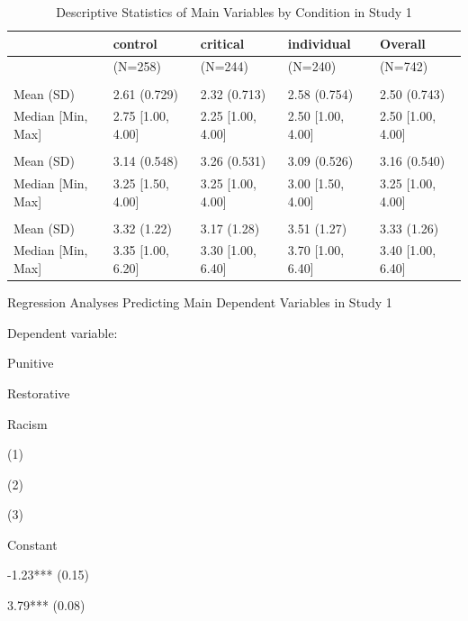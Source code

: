 \documentclass[
]{book}
\begin{document}
\begin{table}

\caption{\label{tab:maindvs-table-s1}Descriptive Statistics of Main Variables by Condition in Study 1}
\centering
\begin{tabular}[t]{lllll}
\toprule
  & control & critical & individual & Overall\\
\midrule
 & (N=258) & (N=244) & (N=240) & (N=742)\\
\addlinespace[0.3em]
\multicolumn{5}{l}{\textbf{Punitive Policy Support}}\\
\hspace{1em}Mean (SD) & 2.61 (0.729) & 2.32 (0.713) & 2.58 (0.754) & 2.50 (0.743)\\
\hspace{1em}Median [Min, Max] & 2.75 [1.00, 4.00] & 2.25 [1.00, 4.00] & 2.50 [1.00, 4.00] & 2.50 [1.00, 4.00]\\
\addlinespace[0.3em]
\multicolumn{5}{l}{\textbf{Restorative Policy Support}}\\
\hspace{1em}Mean (SD) & 3.14 (0.548) & 3.26 (0.531) & 3.09 (0.526) & 3.16 (0.540)\\
\hspace{1em}Median [Min, Max] & 3.25 [1.50, 4.00] & 3.25 [1.00, 4.00] & 3.00 [1.50, 4.00] & 3.25 [1.00, 4.00]\\
\addlinespace[0.3em]
\multicolumn{5}{l}{\textbf{Modern Racism}}\\
\hspace{1em}Mean (SD) & 3.32 (1.22) & 3.17 (1.28) & 3.51 (1.27) & 3.33 (1.26)\\
\hspace{1em}Median [Min, Max] & 3.35 [1.00, 6.20] & 3.30 [1.00, 6.40] & 3.70 [1.00, 6.40] & 3.40 [1.00, 6.40]\\
\bottomrule
\end{tabular}
\end{table}

Regression Analyses Predicting Main Dependent Variables in Study 1

Dependent variable:

Punitive

Restorative

Racism

(1)

(2)

(3)

Constant

-1.23*** (0.15)

3.79*** (0.08)
\end{document}
